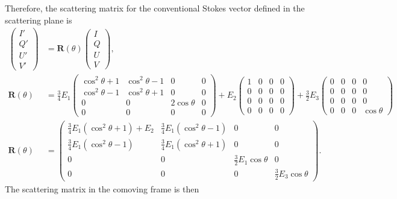 \documentclass[english,a4paper]{kiseon_memo}
\begin{document}
Therefore, the scattering matrix for the conventional Stokes
vector defined in the scattering plane is
\begin{align*}
\left(\begin{array}{c} I'\\ Q'\\ U'\\ V'\end{array}\right)
& = \mathbf{R}(\theta)\left(\begin{array}{c} I\\ Q\\ U\\ V\end{array}\right),\\
\mathbf{R}(\theta) & = \tfrac{3}{4}E_{1}\!\left(\begin{array}{cccc}
\cos^{2}\theta+1 & \cos^{2}\theta-1 & 0 & 0\\
\cos^{2}\theta-1 & \cos^{2}\theta+1 & 0 & 0\\
0 & 0 & 2\cos\theta & 0\\
0 & 0 & 0 & 0
\end{array}\right)
+E_{2}\!\left(\begin{array}{cccc}
1 & 0 & 0 & 0\\
0 & 0 & 0 & 0\\
0 & 0 & 0 & 0\\
0 & 0 & 0 & 0
\end{array}\right)
+\tfrac{3}{2}E_{3}\!\left(\begin{array}{cccc}
0 & 0 & 0 & 0\\
0 & 0 & 0 & 0\\
0 & 0 & 0 & 0\\
0 & 0 & 0 & \cos\theta
\end{array}\right)\\[2pt]
\mathbf{R}(\theta) & = \left(\begin{array}{cccc}
\tfrac{3}{4}E_{1}\!\left(\cos^{2}\theta+1\right)+E_{2} & \tfrac{3}{4}E_{1}\!\left(\cos^{2}\theta-1\right) & 0 & 0\\
\tfrac{3}{4}E_{1}\!\left(\cos^{2}\theta-1\right) & \tfrac{3}{4}E_{1}\!\left(\cos^{2}\theta+1\right) & 0 & 0\\
0 & 0 & \tfrac{3}{2}E_{1}\cos\theta & 0\\
0 & 0 & 0 & \tfrac{3}{2}E_{3}\cos\theta
\end{array}\right).
\end{align*}
The scattering matrix in the comoving frame is then
\end{document}
